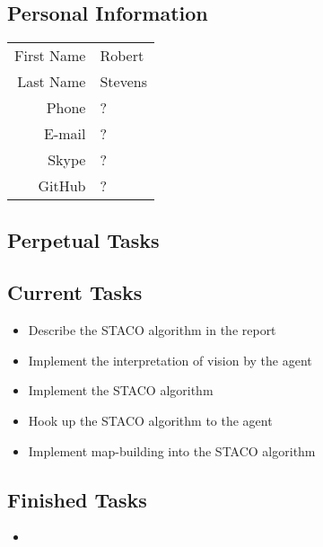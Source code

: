 \subsection{Personal Information}
\begin{table}[h!]
	\begin{tabular}{rl}
	First Name 	& Robert\\
	Last Name	& Stevens\\
	Phone		& ?\\
	E-mail		& ?\\
	Skype		& ?\\
	GitHub		& ?
\end{tabular}
\end{table}

\subsection{Perpetual Tasks}

\subsection{Current Tasks}
\begin{itemize}
	\item Describe the STACO algorithm in the report
	\item Implement the interpretation of vision by the agent
	\item Implement the STACO algorithm
	\item Hook up the STACO algorithm to the agent
	\item Implement map-building into the STACO algorithm
\end{itemize}

\subsection{Finished Tasks}
\begin{itemize}
	\item
\end{itemize}
